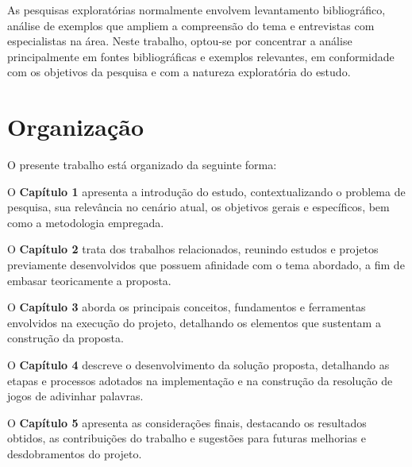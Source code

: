 As pesquisas exploratórias normalmente envolvem levantamento bibliográfico, análise de exemplos que ampliem a compreensão do tema e entrevistas com especialistas na área. Neste trabalho, optou-se por concentrar a análise principalmente em fontes bibliográficas e exemplos relevantes, em conformidade com os objetivos da pesquisa e com a natureza exploratória do estudo.


\section{Organização}
O presente trabalho está organizado da seguinte forma:

O \textbf{Capítulo 1} apresenta a introdução do estudo, contextualizando o problema de pesquisa, sua relevância no cenário atual, os objetivos gerais e específicos, bem como a metodologia empregada.

O \textbf{Capítulo 2} trata dos trabalhos relacionados, reunindo estudos e projetos previamente desenvolvidos que possuem afinidade com o tema abordado, a fim de embasar teoricamente a proposta.

O \textbf{Capítulo 3} aborda os principais conceitos, fundamentos e ferramentas envolvidos na execução do projeto, detalhando os elementos que sustentam a construção da proposta.

O \textbf{Capítulo 4} descreve o desenvolvimento da solução proposta, detalhando as etapas e processos adotados na implementação e na construção da resolução de jogos de adivinhar palavras.

O \textbf{Capítulo 5} apresenta as considerações finais, destacando os resultados obtidos, as contribuições do trabalho e sugestões para futuras melhorias e desdobramentos do projeto.